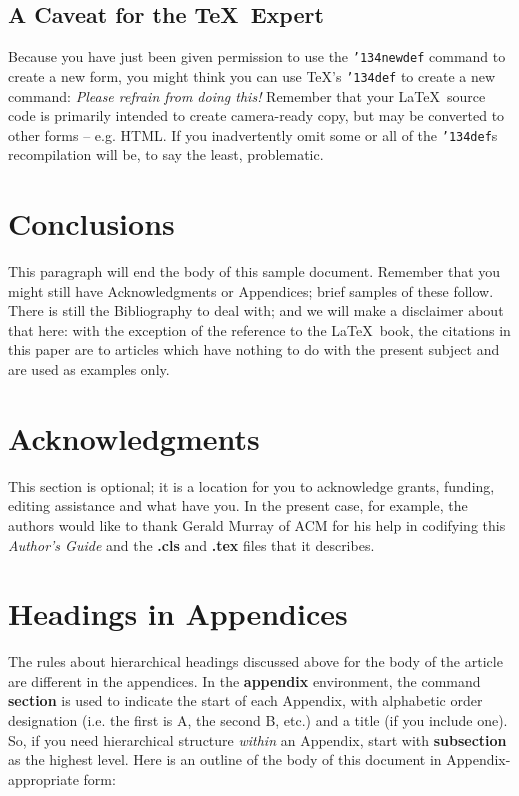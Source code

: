 \documentclass{acm_proc_article-sp-sigmod09}
\begin{document}
\subsection*{A {\secit Caveat} for the \TeX\ Expert}
Because you have just been given permission to
use the \texttt{{\char'134}newdef} command to create a
new form, you might think you can
use \TeX's \texttt{{\char'134}def} to create a
new command: \textit{Please refrain from doing this!}
Remember that your \LaTeX\ source code is primarily intended
to create camera-ready copy, but may be converted
to other forms -- e.g. HTML. If you inadvertently omit
some or all of the \texttt{{\char'134}def}s recompilation will
be, to say the least, problematic.

\section{Conclusions}
This paragraph will end the body of this sample document.
Remember that you might still have Acknowledgments or
Appendices; brief samples of these
follow.  There is still the Bibliography to deal with; and
we will make a disclaimer about that here: with the exception
of the reference to the \LaTeX\ book, the citations in
this paper are to articles which have nothing to
do with the present subject and are used as
examples only.

\section{Acknowledgments}
This section is optional; it is a location for you
to acknowledge grants, funding, editing assistance and
what have you.  In the present case, for example, the
authors would like to thank Gerald Murray of ACM for
his help in codifying this \textit{Author's Guide}
and the \textbf{.cls} and \textbf{.tex} files that it describes.

%

%
%
\appendix
\section{Headings in Appendices}
The rules about hierarchical headings discussed above for
the body of the article are different in the appendices.
In the \textbf{appendix} environment, the command
\textbf{section} is used to
indicate the start of each Appendix, with alphabetic order
designation (i.e. the first is A, the second B, etc.) and
a title (if you include one).  So, if you need
hierarchical structure
\textit{within} an Appendix, start with \textbf{subsection} as the
highest level. Here is an outline of the body of this
document in Appendix-appropriate form:
\end{document}
